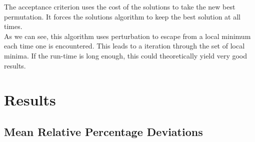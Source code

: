 The acceptance criterion uses the cost of the solutions to take the new best permutation. It forces the solutions algorithm to keep the best solution at all times.\\

As we can see, this algorithm uses perturbation to escape from a local minimum each time one is encountered. This leads to a iteration through the set of local minima. If the run-time is long enough, this could theoretically yield very good results.\\

\section{Results}

\subsection{Mean Relative Percentage Deviations}

